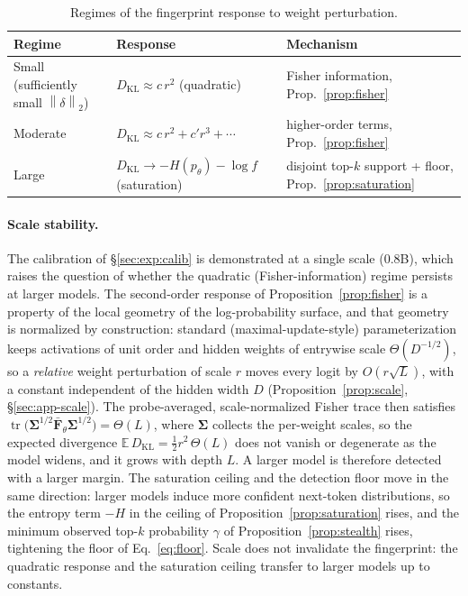 \documentclass[11pt]{article}
\newcommand{\E}{\mathbb{E}}
\newcommand{\norm}[1]{\left\lVert #1 \right\rVert}
\theoremstyle{definition}
\begin{document}
\begin{table}[t]
\centering
\small
\caption{Regimes of the fingerprint response to weight perturbation.}
\label{tab:regimes}
\begin{tabular}{lll}
\toprule
Regime & Response & Mechanism \\
\midrule
Small (sufficiently small $\norm{\delta}_2$) & $D_{\mathrm{KL}} \approx c\, r^2$ (quadratic) & Fisher information, Prop.~\ref{prop:fisher} \\
Moderate & $D_{\mathrm{KL}} \approx c\, r^2 + c' r^3 + \cdots$ & higher-order terms, Prop.~\ref{prop:fisher} \\
Large & $D_{\mathrm{KL}} \to -H(p_\theta) - \log f$ (saturation) & disjoint top-$k$ support + floor, Prop.~\ref{prop:saturation} \\
\bottomrule
\end{tabular}
\end{table}

\paragraph{Scale stability.}
The calibration of \S\ref{sec:exp:calib} is demonstrated at a single scale
($0.8$B), which raises the question of whether the quadratic
(Fisher-information) regime persists at larger models. The second-order
response of Proposition~\ref{prop:fisher} is a property of the local geometry
of the log-probability surface, and that geometry is normalized by
construction: standard (maximal-update-style) parameterization keeps
activations of unit order and hidden weights of entrywise scale
$\Theta(D^{-1/2})$, so a \emph{relative} weight perturbation of scale $r$
moves every logit by $O(r\sqrt{L})$, with a constant independent of the hidden
width $D$ (Proposition~\ref{prop:scale}, \S\ref{sec:app-scale}). The
probe-averaged, scale-normalized Fisher trace then satisfies
$\operatorname{tr}\!\big(\bm{\Sigma}^{1/2}\bar{\bm{F}}_\theta
\bm{\Sigma}^{1/2}\big) = \Theta(L)$, where $\bm{\Sigma}$ collects the
per-weight scales, so the expected divergence
$\E\,D_{\mathrm{KL}} = \tfrac12 r^2\,\Theta(L)$ does not vanish or degenerate
as the model widens, and it grows with depth $L$. A larger model is therefore
detected with a larger margin. The saturation ceiling and the detection floor
move in the same direction: larger models induce more confident next-token
distributions, so the entropy term $-H$ in the ceiling of
Proposition~\ref{prop:saturation} rises, and the minimum observed top-$k$
probability $\gamma$ of Proposition~\ref{prop:stealth} rises, tightening the
floor of Eq.~\eqref{eq:floor}. Scale does not invalidate the fingerprint: the
quadratic response and the saturation ceiling transfer to larger models up to
constants.
\end{document}
